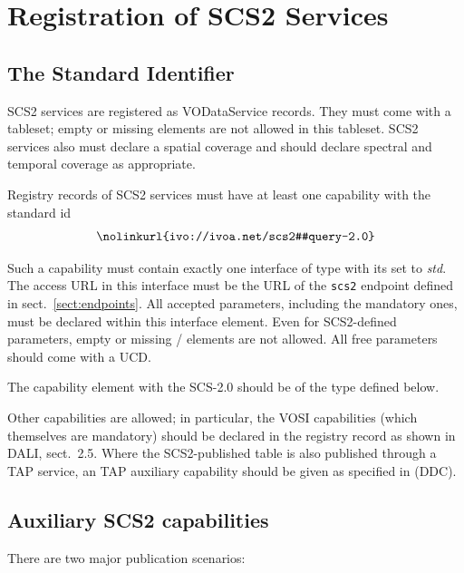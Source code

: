 \documentclass[11pt,a4paper]{ivoa}
\begin{document}
\section{Registration of SCS2 Services}

\subsection{The Standard Identifier}
\label{sect:standard-id}

SCS2 services are registered as VODataService
\citep{2021ivoa.spec.1102D}  records.  They must come
with a tableset; empty or missing  elements are
not allowed in this tableset.  SCS2 services also must declare a spatial
coverage and should declare spectral and temporal coverage as
appropriate.

Registry records of SCS2 services must have at least one capability with
the standard id
$$
\hbox{\nolinkurl{ivo://ivoa.net/scs2#query-2.0}}
$$

Such a capability must contain exactly one interface of type
 with its  set to \emph{std}.  The
access URL in this interface must be the URL of the \verb|scs2| endpoint
defined in sect.~\ref{sect:endpoints}.  All
accepted parameters, including the mandatory ones, must be declared
within this interface element.  Even for SCS2-defined parameters, empty
or missing / elements
are not allowed.  All free
parameters should come with a UCD.

The capability element with the SCS-2.0  should be of
the type  defined below.

Other capabilities are allowed; in particular, the VOSI capabilities
(which themselves are mandatory) should be declared in the registry
record as shown in DALI, sect.~2.5.  Where the SCS2-published table is
also published through a TAP service, an TAP auxiliary capability
should be given as specified in \citet{2019ivoa.spec.0520D} (DDC).

\subsection{Auxiliary SCS2 capabilities}

There are two major publication scenarios:
\end{document}
